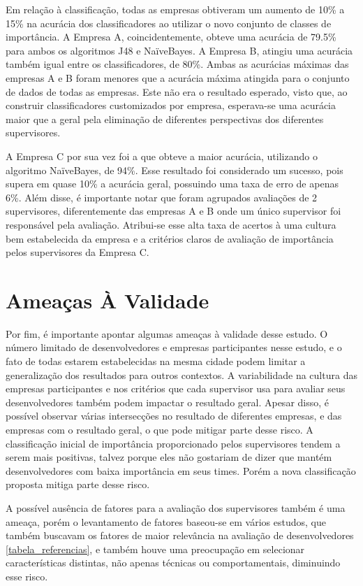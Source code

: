Em relação à classificação, todas as empresas obtiveram um aumento de 10\% a 15\% na acurácia dos classificadores ao utilizar o novo conjunto de classes de importância. A Empresa A, coincidentemente, obteve uma acurácia de 79.5\% para ambos os algoritmos J48 e NaïveBayes. A Empresa B, atingiu uma acurácia também igual entre os classificadores, de 80\%. Ambas as acurácias máximas das empresas A e B foram menores que a acurácia máxima atingida para o conjunto de dados de todas as empresas. Este não era o resultado esperado, visto que, ao construir classificadores customizados por empresa, esperava-se uma acurácia maior que a geral pela eliminação de diferentes perspectivas dos diferentes supervisores.

A Empresa C por sua vez foi a que obteve a maior acurácia, utilizando o algoritmo NaïveBayes, de 94\%. Esse resultado foi considerado um sucesso, pois supera em quase 10\% a acurácia geral, possuindo uma taxa de erro de apenas 6\%. Além disse, é importante notar que foram agrupados avaliações de 2 supervisores, diferentemente das empresas A e B onde um único supervisor foi responsável pela avaliação. Atribui-se esse alta taxa de acertos à uma cultura bem estabelecida da empresa e a critérios claros de avaliação de importância pelos supervisores da Empresa C.

\section{Ameaças À Validade}

Por fim, é importante apontar algumas ameaças à validade desse estudo. O número limitado de desenvolvedores e empresas participantes nesse estudo, e o fato de todas estarem estabelecidas na mesma cidade podem limitar a generalização dos resultados para outros contextos. A variabilidade na cultura das empresas participantes e nos critérios que cada supervisor usa para avaliar seus desenvolvedores também podem impactar o resultado geral. Apesar disso, é possível observar várias intersecções no resultado de diferentes empresas, e das empresas com o resultado geral, o que pode mitigar parte desse risco. A classificação inicial de importância proporcionado pelos supervisores tendem a serem mais positivas, talvez porque eles não gostariam de dizer que mantém desenvolvedores com baixa importância em seus times. Porém a nova classificação proposta mitiga parte desse risco.

A possível ausência de fatores para a avaliação dos supervisores também é uma ameaça, porém o levantamento de fatores baseou-se em vários estudos, que também buscavam os fatores de maior relevância na avaliação de desenvolvedores \autoref{tabela_referencias}, e também houve uma preocupação em selecionar características distintas, não apenas técnicas ou comportamentais, diminuindo esse risco.